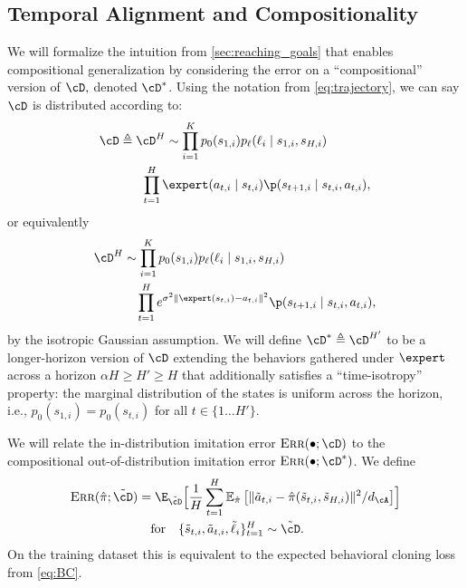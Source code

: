 \begin{rebuttal}
    \subsection{Temporal Alignment and Compositionality}
    \label{sec:compositionality}

    We will formalize the intuition from \cref{sec:reaching_goals} that \Method{} enables compositional generalization by considering the error on a ``compositional'' version of $\cD,$ denoted $\cD^{*}$.
    Using the notation from \cref{eq:trajectory}, we can say $\cD$ is distributed according to:
    \begin{align}
        &\cD \triangleq \cD^{H} \sim \prod_{i=1}^{K} p_0(s_{1,i}) p_{\ell}(\ell_{i} \mid s_{1,i}, s_{H,i})
            \nonumber\\*
          &\mspace{60mu} \prod_{t=1}^{H} \expert(a_{t,i} \mid s_{t,i}) \p(s_{t+1,i} \mid s_{t,i}, a_{t,i}) ,
            \label{eq:dataset_distribution}
    \end{align}
    or equivalently
    \begin{align}
            &\cD^{H} \sim \prod_{i=1}^{K} p_0(s_{1,i}) p_{\ell}(\ell_{i} \mid s_{1,i}, s_{H,i}) \nonumber\\*
            &\mspace{60mu} \prod_{t=1}^{H}
            e^{\sigma^2\|\expert(s_{t,i}) - a_{t,i}\|^2}\p(s_{t+1,i} \mid s_{t,i}, a_{t,i}) ,
            \label{eq:dataset_distribution_2}
    \end{align}
    by the isotropic Gaussian assumption.
    We will define $\cD^{*} \triangleq \cD^{H'}$ to be a longer-horizon version of $\cD$ extending the behaviors gathered under $\expert$ across a horizon $\alpha H \ge H' \ge H$ that additionally satisfies a ``time-isotropy'' property: the marginal distribution of the states is uniform across the horizon, i.e., $p_0(s_{1,i}) = p_0(s_{t,i})$ for all $t \in \{1\ldots H'\}$.

    We will relate the in-distribution imitation error $\textsc{Err}(\bullet; \cD)$ to the compositional out-of-distribution imitation error $\textsc{Err}(\bullet;\cD^{*})$.
    We define
    \begin{align}
        \textsc{Err}(\hat{\pi}; \tilde{\cD})
        &= \E_{\tilde{\cD}}\Bigl[\frac{1}{H}\sum_{t=1}^{H} \mathbb{E}_{\hat{\pi}}\left[\|\tilde{a}_{t,i} -
        \hat{\pi}(\tilde{s}_{t,i}, \tilde{s}_{H, i})\|^{2}/d_{\cA}\right]\Bigr] \nonumber\\
        &\quad \text{for} \quad \{\tilde{s}_{t,i},\tilde{a}_{t,i},\tilde{\ell}_{i}\}_{t=1}^{H} \sim
            \tilde{\cD}.
            \label{eq:imitation_error}
    \end{align}
    On the training dataset this is equivalent to the expected behavioral cloning loss from \cref{eq:BC}.


\end{rebuttal}

